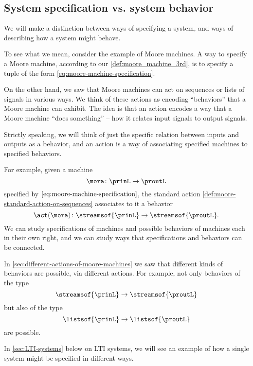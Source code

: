 
\subsection{System specification vs. system behavior}

We will make a distinction between ways of specifying a system, and ways of describing how a system might behave.

To see what we mean, consider the example of Moore machines.
A way to specify a Moore machine, according to our \cref{def:moore_machine_3rd}, is to specify a tuple of the form \cref{eq:moore-machine-specification}.

On the other hand, we saw that Moore machines can act on sequences or lists of signals in various ways.
We think of these actions as encoding ``behaviors'' that a Moore machine can exhibit.
The idea is that an action encodes a way that a Moore machine ``does something'' -- how it relates input signals to output signals.

Strictly speaking, we will think of just the specific relation between inputs and outputs as a behavior, and an action is a way of associating specified machines to specified behaviors.


For example, given a machine
\begin{equation}
    \mora \colon \prinL \to \proutL
\end{equation}
specified by $\cref{eq:moore-machine-specification}$, the standard action \cref{def:moore-standard-action-on-sequences} associates to it a behavior
\begin{equation}
    \act(\mora) \colon \streamsof{\prinL} \to \streamsof{\proutL}.
\end{equation}
We can study specifications of machines and possible behaviors of machines each in their own right, and we can study ways that specifications and behaviors can be connected.

In \cref{sec:different-actions-of-moore-machines} we saw that different kinds of behaviors are possible, via different actions.
For example, not only behaviors of the type
\begin{equation}
    \streamsof{\prinL}  \to \streamsof{\proutL}
\end{equation}
but also of the type
\begin{equation}
    \listsof{\prinL} \to \listsof{\proutL}
\end{equation}
are possible.

In \cref{sec:LTI-systems} below on LTI systems, we will see an example of how a single system might be specified in different ways.

